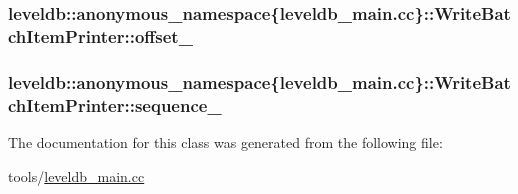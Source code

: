 \subsubsection[{offset\+\_\+}]{ leveldb\+::anonymous\+\_\+namespace\{leveldb\+\_\+main.\+cc\}\+::Write\+Batch\+Item\+Printer\+::offset\+\_\+}\label{classleveldb_1_1anonymous__namespace_02leveldb__main_8cc_03_1_1_write_batch_item_printer_af9453d5aa13b28e83ce7a2b9e5537469}
\hypertarget{classleveldb_1_1anonymous__namespace_02leveldb__main_8cc_03_1_1_write_batch_item_printer_ac9f202808769c048c257f14f400e32d7}{}
\subsubsection[{sequence\+\_\+}]{ leveldb\+::anonymous\+\_\+namespace\{leveldb\+\_\+main.\+cc\}\+::Write\+Batch\+Item\+Printer\+::sequence\+\_\+}\label{classleveldb_1_1anonymous__namespace_02leveldb__main_8cc_03_1_1_write_batch_item_printer_ac9f202808769c048c257f14f400e32d7}


The documentation for this class was generated from the following file\+:\begin{DoxyCompactItemize}
\item 
tools/\hyperlink{leveldb__main_8cc}{leveldb\+\_\+main.\+cc}\end{DoxyCompactItemize}
